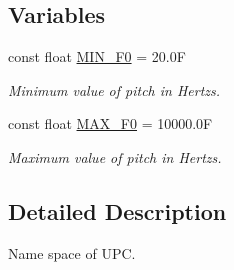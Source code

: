 \subsection*{Variables}
\begin{DoxyCompactItemize}
\item 
\mbox{\label{namespaceupc_ae8ed4ce6dc2c05dfc1aa6432db41e1ae}} 
const float \hyperlink{namespaceupc_ae8ed4ce6dc2c05dfc1aa6432db41e1ae}{M\+I\+N\+\_\+\+F0} = 20.\+0F
\begin{DoxyCompactList}\small\item\em Minimum value of pitch in Hertzs. \end{DoxyCompactList}\item 
\mbox{\label{namespaceupc_ab69be42753266b6e1a0deaa8eba56a19}} 
const float \hyperlink{namespaceupc_ab69be42753266b6e1a0deaa8eba56a19}{M\+A\+X\+\_\+\+F0} = 10000.\+0F
\begin{DoxyCompactList}\small\item\em Maximum value of pitch in Hertzs. \end{DoxyCompactList}\end{DoxyCompactItemize}


\subsection{Detailed Description}
Name space of U\+PC. 